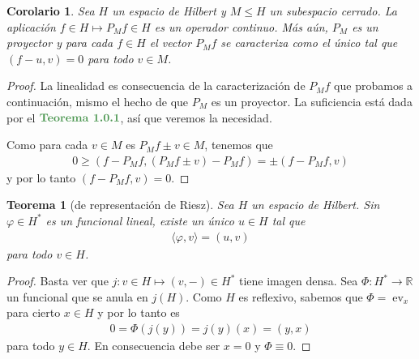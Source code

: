 \documentclass[11pt]{report}
\theoremstyle{colored}
\newtheorem{theorem}{Teorema}[section]
\newtheorem{corollary}{Corolario}[section]
\newcommand{\R}{\mathbb{R}}
\newcommand{\ev}{\operatorname{ev}}
\newcommand{\ip}[1]{( #1 )}
\newcommand{\paint}[1]{\color{color}{#1}}
\newcommand{\tpaint}[1]{\paint{\textbf{#1}}}
\begin{document}
\begin{corollary} Sea $H$ un espacio de Hilbert y $M \leq H$ un subespacio cerrado. La aplicación $f \in H \mapsto P_Mf \in H$ es un operador continuo. Más aún, $P_M$ es un proyector y para cada $f \in H$ el vector $P_Mf$ se caracteriza como el único tal que $\ip{f-u,v} = 0$ para todo $v \in M$.
\end{corollary}
\begin{proof} La linealidad es consecuencia de la caracterización de $P_Mf$ que probamos a continuación, mismo el hecho de que $P_M$ es un proyector. La suficiencia está dada por el $\tpaint{Teorema 1.0.1}$, así que veremos la necesidad. 

Como para cada $v \in M$ es $P_Mf \pm v \in M$, tenemos que
\begin{align*}
0 \geq (f-P_Mf, (P_Mf \pm v) - P_Mf) = \pm(f-P_Mf,v)
\end{align*}
y por lo tanto $(f-P_Mf,v) = 0$. 
\end{proof}

\begin{theorem}[de representación de Riesz] Sea $H$ un espacio de Hilbert. Sin $\varphi \in H^*$ es un funcional lineal, existe un único $u \in H$ tal que
\begin{align*}
\langle \varphi, v\rangle  = \ip{u,v}
\end{align*}
para todo $v \in H$.
\end{theorem}
\begin{proof} Basta ver que $j : v \in H \mapsto \ip{v,-} \in H^*$ tiene imagen densa. Sea $\Phi : H^* \to \R$ un funcional que se anula en $j(H)$. Como $H$ es reflexivo, sabemos que $\Phi = \ev_{x}$ para cierto $x \in H$ y por lo tanto es
\begin{align*}
0 = \Phi(j(y)) = j(y)(x) = \ip{y,x}
\end{align*}
para todo $y \in H$. En consecuencia debe ser $x = 0$ y $\Phi \equiv 0$.
\end{proof}
\end{document}

